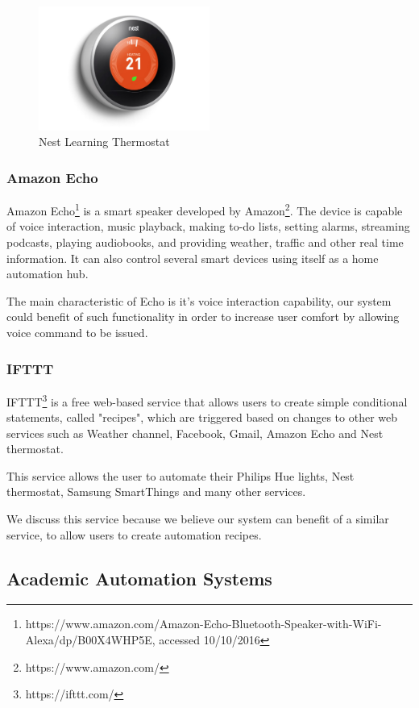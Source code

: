 \begin{figure}[h]
\centering
\includegraphics[width=0.5\textwidth]{Figures/nest}
\caption{Nest Learning Thermostat}
\label{fig:nest}
\end{figure}


\subsubsection{Amazon Echo}
Amazon Echo\footnote{https://www.amazon.com/Amazon-Echo-Bluetooth-Speaker-with-WiFi-Alexa/dp/B00X4WHP5E, accessed 10/10/2016} is a smart speaker developed by Amazon\footnote{https://www.amazon.com/}. The device is capable of voice interaction, music playback, making to-do lists, setting alarms, streaming podcasts, playing audiobooks, and providing weather, traffic and other real time information. It can also control several smart devices using itself as a home automation hub.

The main characteristic of Echo is it's voice interaction capability, our system could benefit of such functionality in order to increase user comfort by allowing voice command to be issued.


\subsubsection{IFTTT}

IFTTT\footnote{https://ifttt.com/} is a free web-based service that allows users to create simple conditional statements, called "recipes", which are triggered based on changes to other web services such as Weather channel, Facebook, Gmail, Amazon Echo and Nest thermostat. 

This service allows the user to automate their Philips Hue lights, Nest thermostat, Samsung SmartThings and many other services.

We discuss this service because we believe our system can benefit of a similar service, to allow users to create automation recipes.


\subsection{Academic Automation Systems}

